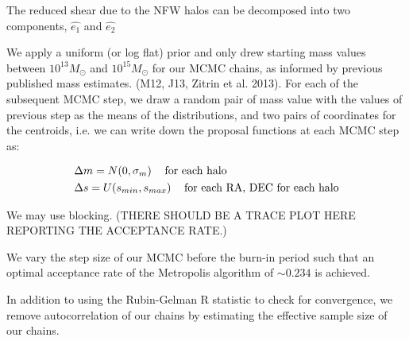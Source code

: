 The reduced shear due to the NFW halos can be
decomposed into two components, $\hat{e_1}$ and $\hat{e_2}$  

We apply a uniform (or log flat) prior and only drew starting mass values between
$10^{13} M_\odot$ and $10^{15} M_\odot$ for our MCMC
chains, as informed by previous published mass estimates. (M12, J13, Zitrin
et al. 2013). For each of the subsequent MCMC step, we 
draw a random pair of mass value with the values of
previous step as the means of the distributions, and two pairs of
coordinates for the centroids, i.e. we can write down the
proposal functions at each MCMC step as: 

\begin{align}
	&\Delta m = N(0, \sigma_m) \hspace{1pc} \text{for each halo} \\
	&\Delta s = U(s_{min}, s_{max}) \hspace{1pc} \text{for each RA, DEC for
	each halo}
\end{align}






We may use blocking. 
(THERE SHOULD BE A TRACE PLOT HERE REPORTING THE ACCEPTANCE RATE.)

We vary the step size of our MCMC  before the burn-in period such that an
optimal acceptance rate of the Metropolis algorithm of $\sim0.234$ \citep{Roberts97} is achieved.

In addition to using the Rubin-Gelman R statistic to check for convergence,
we remove autocorrelation of our chains by estimating the effective sample
size of our chains.
 
